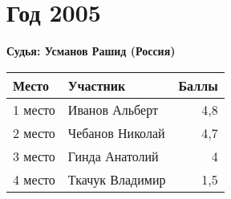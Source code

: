\chapter{Год 2005}
\textbf{Судья: Усманов Рашид (Россия)}

\begin{tabularx}{\textwidth}{l l r}
Место & Участник & Баллы \\
\hline
1 место & Иванов Альберт & 4,8 \\
2 место & Чебанов Николай & 4,7 \\
3 место & Гинда Анатолий & 4 \\
4 место & Ткачук Владимир & 1,5 \\
\end{tabularx}